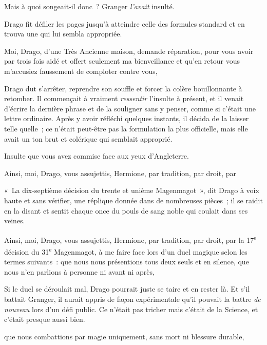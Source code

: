 Mais à quoi songeait-il donc~? Granger \emph{l'avait} insulté.

Drago fit défiler les pages jusqu'à atteindre celle des formules standard et en trouva une qui lui sembla appropriée.

\begin{writtenNote}
Moi, Drago, d'une Très Ancienne maison, demande réparation, pour vous avoir par trois fois aidé et offert seulement ma bienveillance et qu'en retour vous m'accusiez {faussement} de comploter contre vous, \end{writtenNote}

Drago dut s'arrêter, reprendre son souffle et forcer la colère bouillonnante à retomber. Il commençait à vraiment \emph{ressentir} l'insulte à présent, et il venait d'écrire la dernière phrase et de la souligner sans y penser, comme si c'était une lettre ordinaire. Après y avoir réfléchi quelques instants, il décida de la laisser telle quelle~; ce n'était peut-être pas la formulation la plus officielle, mais elle avait un ton brut et colérique qui semblait approprié.

\begin{writtenNote}
Insulte que vous avez commise face aux yeux d'Angleterre.

Ainsi, moi, Drago, vous assujettis, Hermione, par tradition, par droit, par
\end{writtenNote}

«~La dix-septième décision du trente et unième Magenmagot~», dit Drago à voix haute et sans vérifier, une réplique donnée dans de nombreuses pièces~; il se raidit en la disant et sentit chaque once du pouls de sang noble qui coulait dans ses veines.

\begin{writtenNote}
Ainsi, moi, Drago, vous assujettis, Hermione, par tradition, par droit, par la 17\textsuperscript{e} décision du 31\textsuperscript{e} Magenmagot, à me faire face lors d'un duel magique selon les termes suivants~: que nous nous présentions tous deux seuls et en silence, que nous n'en parlions à personne ni avant ni après,\end{writtenNote}

Si le duel se déroulait mal, Drago pourrait juste se taire et en rester là. Et s'il battait Granger, il aurait appris de façon expérimentale qu'il pouvait la battre \emph{de nouveau} lors d'un défi public. Ce n'était pas tricher mais c'était de la Science, et c'était presque aussi bien.

\begin{writtenNote}
que nous combattions par magie uniquement, sans mort ni blessure durable,
\end{writtenNote}

